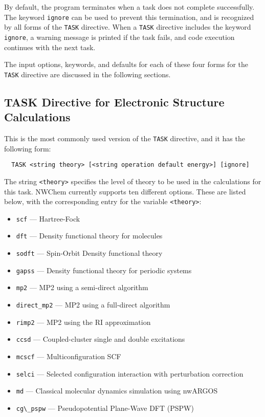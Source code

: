 By default, the program terminates when a task does not complete
successfully.  The keyword \verb+ignore+ can be used to prevent this
termination, and is recognized by all forms of the \verb+TASK+
directive.  When a \verb+TASK+ directive includes the keyword
\verb+ignore+, a warning message is printed if the task fails, and
code execution continues with the next task.

The input options, keywords, and defaults for each of these four forms
for the \verb+TASK+ directive are discussed in the following sections.

\subsection{TASK Directive for Electronic Structure Calculations}
\label{sec:first_task}

This is the most commonly used version of the \verb+TASK+ directive, and
it has the following form:

\begin{verbatim}
  TASK <string theory> [<string operation default energy>] [ignore]
\end{verbatim}

The string \verb+<theory>+ specifies the level of theory to be used in the
calculations for this task.  NWChem currently supports ten different
options.  These are listed below, with the corresponding entry for 
the variable {\tt <theory>}:
\begin{itemize}
 \item \verb+scf+ --- Hartree-Fock
 \item \verb+dft+ --- Density functional theory for molecules
 \item \verb+sodft+ --- Spin-Orbit Density functional theory
 \item \verb+gapss+ --- Density functional theory for periodic systems
 \item \verb+mp2+ --- MP2 using a semi-direct algorithm
 \item \verb+direct_mp2+ --- MP2 using a full-direct algorithm
 \item \verb+rimp2+ --- MP2 using the RI approximation
 \item \verb+ccsd+ --- Coupled-cluster single and double excitations
 \item \verb+mcscf+ --- Multiconfiguration SCF
 \item \verb+selci+ --- Selected configuration interaction with perturbation
   correction 
 \item \verb+md+ --- Classical molecular dynamics simulation using nwARGOS
 \item \verb+cg\_pspw+ --- Pseudopotential Plane-Wave DFT (PSPW)
\end{itemize}

